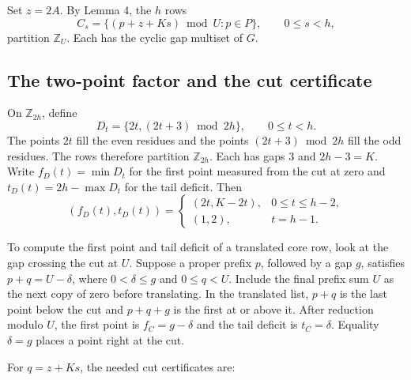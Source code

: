\documentclass[11pt,a4paper]{article}
\begin{document}
Set \(z=2A\). By Lemma 4, the \(h\) rows \begin{equation}
C_s=\{(p+z+Ks)\bmod U:p\in P\},\qquad 0\leq s<h,
\tag{6}\label{eq:6}
\end{equation} partition \(\mathbb Z_U\). Each has the cyclic gap multiset of \(G\).

\hypertarget{the-two-point-factor-and-the-cut-certificate}{%
\subsection{The two-point factor and the cut certificate}\label{the-two-point-factor-and-the-cut-certificate}}

On \(\mathbb Z_{2h}\), define \begin{equation}
D_t=\{2t,(2t+3)\bmod 2h\},\qquad 0\leq t<h.
\tag{7}\label{eq:7}
\end{equation} The points \(2t\) fill the even residues and the points \((2t+3)\bmod 2h\) fill the odd residues. The rows therefore partition \(\mathbb Z_{2h}\). Each has gaps \(3\) and \(2h-3=K\). Write \(f_D(t)=\min D_t\) for the first point measured from the cut at zero and \(t_D(t)=2h-\max D_t\) for the tail deficit. Then \begin{equation}
(f_D(t),t_D(t))=
 \begin{cases}
 (2t,K-2t),&0\leq t\leq h-2,\\
 (1,2),&t=h-1.
 \end{cases}
\tag{8}\label{eq:8}
\end{equation}

To compute the first point and tail deficit of a translated core row, look at the gap crossing the cut at \(U\). Suppose a proper prefix \(p\), followed by a gap \(g\), satisfies \(p+q=U-\delta\), where \(0<\delta\leq g\) and \(0\leq q<U\). Include the final prefix sum \(U\) as the next copy of zero before translating. In the translated list, \(p+q\) is the last point below the cut and \(p+q+g\) is the first at or above it. After reduction modulo \(U\), the first point is \(f_C=g-\delta\) and the tail deficit is \(t_C=\delta\). Equality \(\delta=g\) places a point right at the cut.

For \(q=z+Ks\), the needed cut certificates are:
\end{document}
